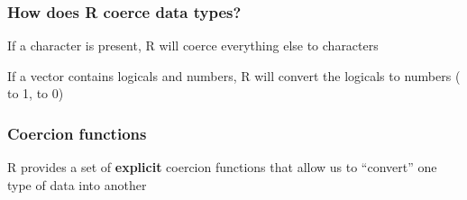 \documentclass[12pt]{beamer}\usepackage[]{graphicx}\usepackage[]{color}
\begin{document}

\begin{frame}[fragile]
\frametitle{How does R coerce data types?}

If a character is present, R will coerce everything else to characters

\bigskip

If a vector contains logicals and numbers, R will convert the logicals to numbers ( to 1,  to 0)
\eb

\end{frame}


\begin{frame}[fragile]
\frametitle{Coercion functions}

R provides a set of \textbf{explicit} coercion functions that allow us to ``convert'' one type of data into another
\eb

\bi
  \item {}
  \item {}
  \item {}
\ei

\end{frame}

\end{document}
